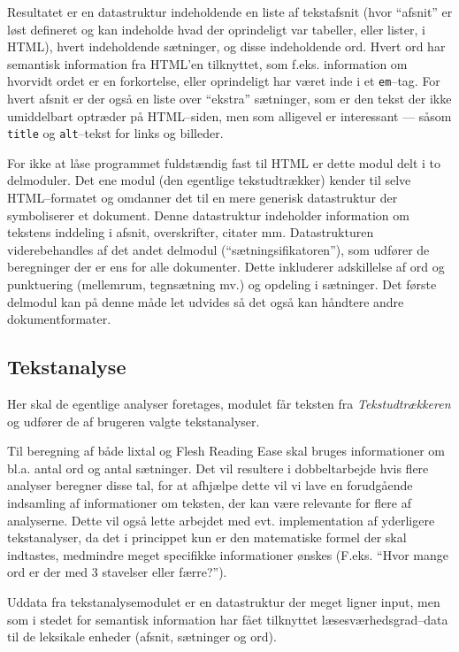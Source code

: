 \documentclass[a4paper,oneside,article]{memoir}
\begin{document}
Resultatet er en datastruktur indeholdende en liste af tekstafsnit
(hvor ``afsnit'' er løst defineret og kan indeholde hvad der
oprindeligt var tabeller, eller lister, i HTML), hvert indeholdende
sætninger, og disse indeholdende ord. Hvert ord har semantisk
information fra HTML'en tilknyttet, som f.eks. information om hvorvidt
ordet er en forkortelse, eller oprindeligt har været inde i et
\texttt{em}--tag. For hvert afsnit er der også en liste over
``ekstra'' sætninger, som er den tekst der ikke umiddelbart optræder
på HTML--siden, men som alligevel er interessant --- såsom
\texttt{title} og \texttt{alt}--tekst for links og billeder.

For ikke at låse programmet fuldstændig fast til HTML er dette modul
delt i to delmoduler. Det ene modul (den egentlige tekstudtrækker)
kender til selve HTML--formatet og omdanner det til en mere generisk
datastruktur der symboliserer et dokument. Denne datastruktur
indeholder information om tekstens inddeling i afsnit, overskrifter,
citater mm. Datastrukturen viderebehandles af det andet delmodul
(``sætningsifikatoren''), som udfører de beregninger der er ens for
alle dokumenter. Dette inkluderer adskillelse af ord og punktuering
(mellemrum, tegnsætning mv.) og opdeling i sætninger.  Det første
delmodul kan på denne måde let udvides så det også kan håndtere andre
dokumentformater.

\subsection{Tekstanalyse}
Her skal de egentlige analyser foretages, modulet får teksten fra
\textit{Tekstudtrækkeren} og udfører de af brugeren valgte
tekstanalyser.

Til beregning af både lixtal og Flesh Reading Ease skal bruges
informationer om bl.a. antal ord og antal sætninger. Det vil resultere
i dobbeltarbejde hvis flere analyser beregner disse tal, for at
afhjælpe dette vil vi lave en forudgående indsamling af informationer
om teksten, der kan være relevante for flere af analyserne. Dette vil
også lette arbejdet med evt. implementation af yderligere
tekstanalyser, da det i princippet kun er den matematiske formel der
skal indtastes, medmindre meget specifikke informationer ønskes
(F.eks. ``Hvor mange ord er der med 3 stavelser eller færre?'').

Uddata fra tekstanalysemodulet er en datastruktur der meget ligner
input, men som i stedet for semantisk information har fået tilknyttet
læsesværhedsgrad--data til de leksikale enheder (afsnit, sætninger og
ord).
\end{document}
